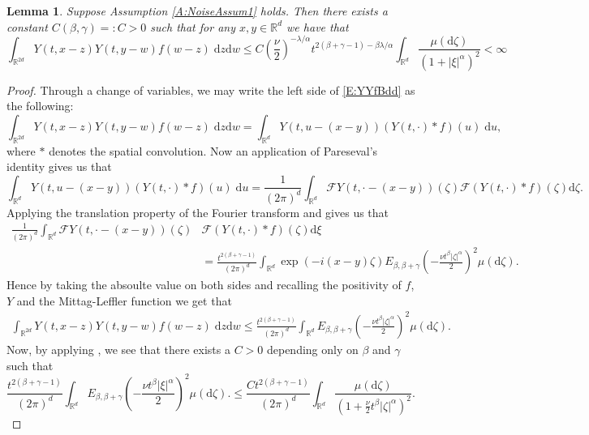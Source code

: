 \documentclass[a4paper,11pt]{article}
\numberwithin{equation}{section}
\theoremstyle{plain}
\newtheorem{lemma}[theorem]{Lemma}
\theoremstyle{definition}
\newcommand{\ud}{\ensuremath{\mathrm{d} }}
\newcommand{\R}{\mathbb{R}}
\numberwithin{NQ}{section}
\numberwithin{LQ}{section}
\numberwithin{ZQ}{section}
\begin{document}
  	\begin{lemma}
  	\label{L:YfYbdd}
  	Suppose Assumption \ref{A:NoiseAssum1} holds. Then there exists a constant $C(\beta,\gamma) =: C >0$ such that for any $x,y \in \R^d$ we have that 
  	\begin{equation}
  	\label{E:YYfBdd}
  	\int_{\R^{2d}} Y(t,x-z)Y(t,y-w)f(w-z) \; \ud z \ud w \le C \left( \frac{\nu}{2} \right)^{-\lambda / \alpha} t^{2(\beta + \gamma -1)-\beta \lambda / \alpha} \int_{\R^{d}}  \frac{ \mu(\ud \zeta) }{\left(1+ |\xi|^\alpha\right)^2 } < \infty
  	\end{equation}
  \end{lemma}
  \begin{proof}
 Through a change of variables, we may write the left side of \eqref{E:YYfBdd} as the following:
  	\[
  	\int_{\R^{2d}} Y(t,x-z)Y(t,y-w)f(w-z) \; \ud z \ud w = \int_{\R^{d}} Y\left(t,u-(x-y)\right)(Y(t,\cdot)*f)(u) \; \ud u,
  	\]
 where $*$ denotes the spatial convolution. Now an application of Pareseval's identity gives us that 
  	\[
  	\int_{\R^{d}} Y\left(t,u-(x-y)\right)(Y(t,\cdot)*f)(u) \; \ud u = \frac{1}{(2\pi)^d} 	\int_{\R^{d}} \mathcal{F}Y\left(t,\cdot-(x-y)\right)(\zeta) \mathcal{F}(Y(t,\cdot)*f)(\zeta) \ud \zeta.
  	\]
 Applying the translation property of the Fourier transform and \cite[Theorem 4.1]{CHN19} gives us that 
  	\begin{align*}
  	\frac{1}{(2\pi)^d} 	\int_{\R^{d}} \mathcal{F}Y\left(t,\cdot-(x-y)\right)(\zeta) & \mathcal{F}(Y(t,\cdot)*f)(\zeta) \ud \xi \\
  	& = \frac{ t^{2(\beta + \gamma -1)}}{ (2\pi)^d } \int_{\R^{d}} \exp(-i(x-y)\zeta) E_{\beta,\beta+\gamma}\left(-\frac{\nu t^\beta |\zeta|^\alpha}{2}\right)^2 \mu(\ud \zeta).
  	\end{align*}
 Hence by taking the absoulte value on both sides and recalling the positivity of $f$, $Y$ and the Mittag-Leffler function we get that 
  	\begin{align*}
  			\int_{\R^{2d}} Y(t,x-z)Y(t,y-w)f(w-z) \; \ud z \ud w \le \frac{ t^{2(\beta + \gamma -1)} }{ (2\pi)^d } \int_{\R^{d}}  E_{\beta,\beta+\gamma}\left(-\frac{\nu t^\beta |\zeta|^\alpha}{2}\right)^2 \mu(\ud \zeta).
  	\end{align*}
Now, by applying \cite[Theorem 1.6]{Podlubny99}, we see that there exists a $C>0$ depending only on $\beta$ and $\gamma$ such that 
	\[
		\frac{ t^{2(\beta + \gamma -1)}}{ (2\pi)^d } \int_{\R^{d}}  E_{\beta,\beta+\gamma}\left(-\frac{\nu t^\beta |\xi|^\alpha}{2}\right)^2 \mu(\ud \zeta).\le 
  		\frac{C  t^{2(\beta + \gamma -1)}}{ (2\pi)^d } \int_{\R^{d}}  \frac{ \mu(\ud \zeta) }{\left(1+ \frac{\nu}{2} t^\beta |\zeta|^\alpha \right)^2 } .
\]
\end{proof}
\end{document}
